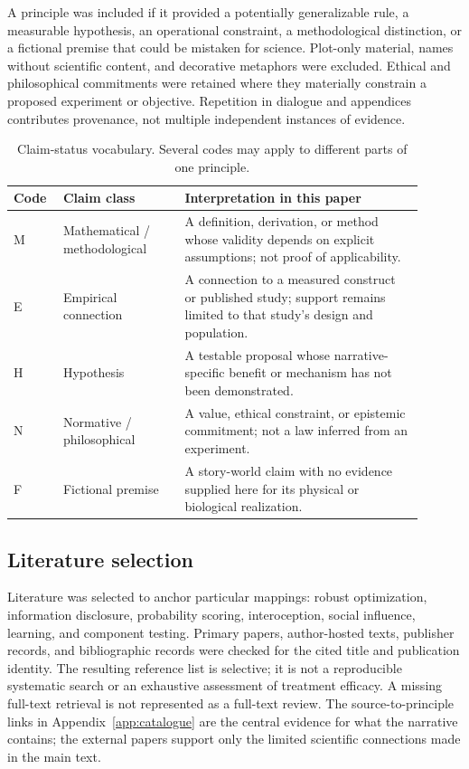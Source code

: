 A principle was included if it provided a potentially generalizable rule, a measurable hypothesis, an operational constraint, a methodological distinction, or a fictional premise that could be mistaken for science. Plot-only material, names without scientific content, and decorative metaphors were excluded. Ethical and philosophical commitments were retained where they materially constrain a proposed experiment or objective. Repetition in dialogue and appendices contributes provenance, not multiple independent instances of evidence.

\begin{table}[htbp]
\centering\small
\begin{tabular}{>{\raggedright\arraybackslash}p{0.10\linewidth}>{\raggedright\arraybackslash}p{0.27\linewidth}>{\raggedright\arraybackslash}p{0.53\linewidth}}
\toprule
Code & Claim class & Interpretation in this paper\\\midrule
M & Mathematical / methodological & A definition, derivation, or method whose validity depends on explicit assumptions; not proof of applicability.\\
E & Empirical connection & A connection to a measured construct or published study; support remains limited to that study's design and population.\\
H & Hypothesis & A testable proposal whose narrative-specific benefit or mechanism has not been demonstrated.\\
N & Normative / philosophical & A value, ethical constraint, or epistemic commitment; not a law inferred from an experiment.\\
F & Fictional premise & A story-world claim with no evidence supplied here for its physical or biological realization.\\\bottomrule
\end{tabular}
\caption{Claim-status vocabulary. Several codes may apply to different parts of one principle.}
\label{tab:status}
\end{table}

\subsection{Literature selection}
Literature was selected to anchor particular mappings: robust optimization, information disclosure, probability scoring, interoception, social influence, learning, and component testing. Primary papers, author-hosted texts, publisher records, and bibliographic records were checked for the cited title and publication identity. The resulting reference list is selective; it is not a reproducible systematic search or an exhaustive assessment of treatment efficacy. A missing full-text retrieval is not represented as a full-text review. The source-to-principle links in Appendix~\ref{app:catalogue} are the central evidence for what the narrative contains; the external papers support only the limited scientific connections made in the main text.
